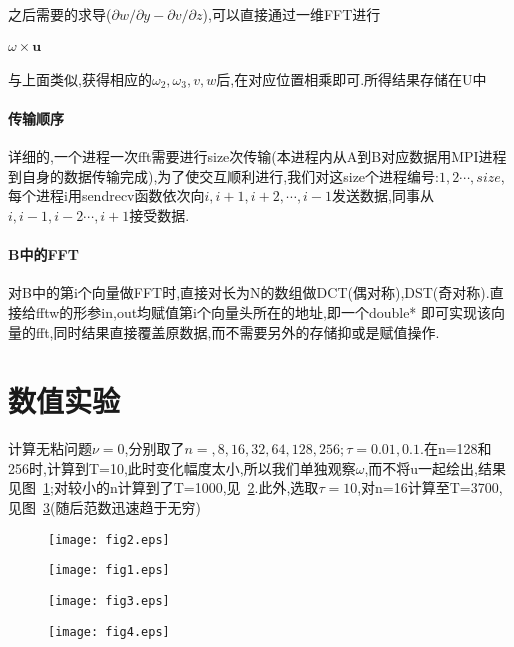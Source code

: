 \documentclass[UTF8]{ctexart}
\begin{document}
之后需要的求导($\partial w/\partial y - \partial v/\partial z$),可以直接通过一维FFT进行

\paragraph{$\omega\times\mathbf{u}$}
与上面类似,获得相应的$\omega_2,\omega_3,v,w$后,在对应位置相乘即可.所得结果存储在U中

\paragraph{传输顺序}
详细的,一个进程一次fft需要进行size次传输(本进程内从A到B对应数据用MPI进程到自身的数据传输完成),为了使交互顺利进行,我们对这size个进程编号:$1,2\cdots,size$,每个进程i用sendrecv函数依次向$i,i+1,i+2,\cdots,i-1$发送数据,同事从$i,i-1,i-2\cdots,i+1$接受数据.
\paragraph{B中的FFT}
对B中的第i个向量做FFT时,直接对长为N的数组做DCT(偶对称),DST(奇对称).直接给fftw的形参in,out均赋值第i个向量头所在的地址,即一个double* 即可实现该向量的fft,同时结果直接覆盖原数据,而不需要另外的存储抑或是赋值操作.


\section{数值实验}
计算无粘问题$\nu=0$,分别取了$n=,8,16,32,64,128,256;\tau=0.01,0.1$.在n=128和256时,计算到T=10,此时变化幅度太小,所以我们单独观察$\omega$,而不将u一起绘出,结果见图~\ref{fig:1};对较小的n计算到了T=1000,见~\ref{fig:2}.此外,选取$\tau=10$,对n=16计算至T=3700,见图~\ref{fig:3}(随后范数迅速趋于无穷)


\begin{figure}[htbp]
\centering\texttt{[image: fig2.eps]}
\caption{}\label{fig:1}
\end{figure}
\begin{figure}[htbp]
\centering\texttt{[image: fig1.eps]}
\caption{}\label{fig:2}
\end{figure}
\begin{figure}[htbp]
\centering\texttt{[image: fig3.eps]}
\caption{}\label{fig:3}
\end{figure}
\begin{figure}[htbp]
\centering\texttt{[image: fig4.eps]}
\caption{}\label{fig:4}
\end{figure}
\end{document}
